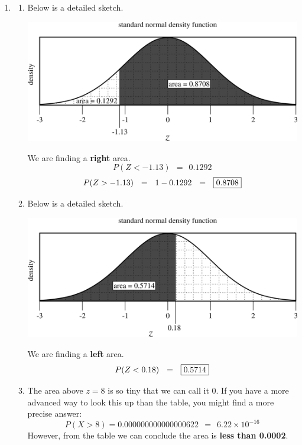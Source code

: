\documentclass[12pt,letterpaper]{article}
\begin{document}
\begin{enumerate}
\newpage
\item \begin{enumerate}
\item Below is a detailed sketch.
\begin{center}
\includegraphics[scale=0.8]{figures/hw3p2a.png}
\end{center}
We are finding a {\bf right} area.
$$P(Z<-1.13)~~ =~~ 0.1292 $$
$$P(Z>-1.13)~~ =~~ 1-0.1292 ~~=~~ \fbox{0.8708} $$
\vfill
\item Below is a detailed sketch.
\begin{center}
\includegraphics[scale=0.8]{figures/hw3p2b.png}
\end{center}
We are finding a {\bf left} area.
$$P(Z< 0.18)~~ =~~ \fbox{0.5714} $$
\vfill

\newpage

\item The area above $z=8$ is so tiny that we can call it 0. If you have a more advanced way to look this up than the table, you might find a more precise answer: 
$$P(X > 8) = 0.000000000000000622 ~~=~~ 6.22 \times 10^{-16}$$
However, from the table we can conclude the area is {\bf less than {0.0002}}.
\vfill


\end{enumerate}
\end{enumerate}
\end{document}
